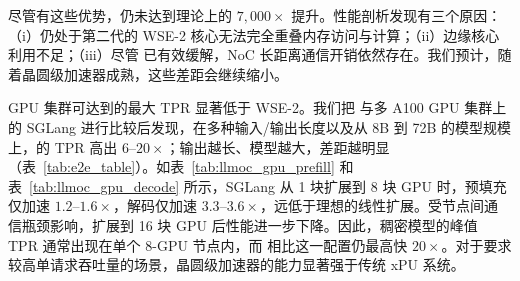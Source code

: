 尽管有这些优势，\gemv 仍未达到理论上的 $7{,}000\times$ 提升。性能剖析发现有三个原因：（i）仍处于第二代的 WSE-2 核心无法完全重叠内存访问与计算；（ii）边缘核心利用不足；（iii）尽管 \gemv 已有效缓解，NoC 长距离通信开销依然存在。我们预计，随着晶圆级加速器成熟，这些差距会继续缩小。

\begin{table}[t]
  \centering
  \caption{比较 \sys（WSE-2）与 SGLang（A100）的预填充吞吐量和能耗。}
  \vspace{-0.3cm}
  \label{tab:llmoc_gpu_prefill}
\end{table}

\begin{table}[t]
  \centering
  \caption{比较 \sys（WSE-2）与 SGLang（A100）的解码吞吐量和能耗。}
  \vspace{-0.3cm}
  \label{tab:llmoc_gpu_decode}
\end{table}

 GPU 集群可达到的最大 TPR 显著低于 WSE-2。我们把 \sys 与多 A100 GPU 集群上的 SGLang 进行比较后发现，在多种输入/输出长度以及从 8B 到 72B 的模型规模上，\sys 的 TPR 高出 $6$--$20\times$；输出越长、模型越大，差距越明显（表~\ref{tab:e2e_table}）。如表~\ref{tab:llmoc_gpu_prefill} 和表~\ref{tab:llmoc_gpu_decode} 所示，SGLang 从 1 块扩展到 8 块 GPU 时，预填充仅加速 $1.2$--$1.6\times$，解码仅加速 $3.3$--$3.6\times$，远低于理想的线性扩展。受节点间通信瓶颈影响，扩展到 16 块 GPU 后性能进一步下降。因此，稠密模型的峰值 TPR 通常出现在单个 8-GPU 节点内，而 \sys 相比这一配置仍最高快 $20\times$。对于要求较高单请求吞吐量的场景，晶圆级加速器的能力显著强于传统 xPU 系统。

